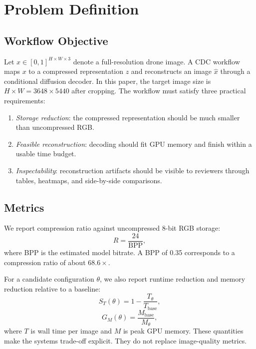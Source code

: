 \documentclass[conference]{IEEEtran}
\begin{document}
\section{Problem Definition}

\subsection{Workflow Objective}

Let $x \in [0,1]^{H \times W \times 3}$ denote a full-resolution drone image. A CDC workflow maps $x$ to a compressed representation $z$ and reconstructs an image $\hat{x}$ through a conditional diffusion decoder. In this paper, the target image size is $H \times W = 3648 \times 5440$ after cropping. The workflow must satisfy three practical requirements:
\begin{enumerate}
\item \textit{Storage reduction}: the compressed representation should be much smaller than uncompressed RGB.
\item \textit{Feasible reconstruction}: decoding should fit GPU memory and finish within a usable time budget.
\item \textit{Inspectability}: reconstruction artifacts should be visible to reviewers through tables, heatmaps, and side-by-side comparisons.
\end{enumerate}

\subsection{Metrics}

We report compression ratio against uncompressed 8-bit RGB storage:
\begin{equation}
R = \frac{24}{\mathrm{BPP}},
\label{eq:ratio}
\end{equation}
where BPP is the estimated model bitrate. A BPP of 0.35 corresponds to a compression ratio of about $68.6\times$.

For a candidate configuration $\theta$, we also report runtime reduction and memory reduction relative to a baseline:
\begin{equation}
S_T(\theta) = 1 - \frac{T_{\theta}}{T_{\mathrm{base}}},
\label{eq:speedup}
\end{equation}
\begin{equation}
G_M(\theta) = \frac{M_{\mathrm{base}}}{M_{\theta}},
\label{eq:memorygain}
\end{equation}
where $T$ is wall time per image and $M$ is peak GPU memory. These quantities make the systems trade-off explicit. They do not replace image-quality metrics.
\end{document}
